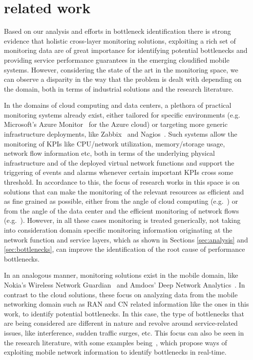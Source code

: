 \documentclass[journal,comsoc]{IEEEtran}
\begin{document}
\section{related work}
\label{sec:related}

% 
Based on our analysis and efforts in bottleneck identification there is strong evidence that holistic cross-layer monitoring solutions, exploiting a rich set of monitoring data are of great importance for identifying potential bottlenecks and providing service performance guarantees in the emerging cloudified mobile systems. However, considering the state of the art in the monitoring space, we can observe a disparity in the way that the problem is dealt with depending on the domain, both in terms of industrial solutions and the research literature.

% 
In the domains of cloud computing and data centers, a plethora of practical monitoring systems already exist, either tailored for specific environments (e.g. Microsoft's Azure Monitor~\cite{azure-mon} for the Azure cloud) or targeting more generic infrastructure deployments, like Zabbix~\cite{zabbix} and Nagios~\cite{nagios}. Such systems allow the monitoring of KPIs like CPU/network utilization, memory/storage usage, network flow information etc, both in terms of the underlying physical infrastructure and of the deployed virtual network functions and support the triggering of events and alarms whenever certain important KPIs cross some threshold. In accordance to this, the focus of research works in this space is on solutions that can make the monitoring of the relevant resources as efficient and as fine grained as possible, either from the angle of cloud computing (e.g.~\cite{calero2015monpaas}) or from the angle of the data center and the efficient monitoring of network flows (e.g.~\cite{li2016flowradar,moshref2016trumpet}). 
However, in all these cases monitoring is treated generically, not taking into consideration domain specific monitoring information originating at the network function and service layers, which as shown in Sections \ref{sec:analysis} and \ref{sec:bottlenecks}, can improve the identification of the root cause of performance bottlenecks. 

% 
In an analogous manner, monitoring solutions exist in the mobile domain, like Nokia's Wireless Network Guardian~\cite{nokia-wng} and Amdocs' Deep Network Analytics~\cite{amdocs}. 
In contrast to the cloud solutions, these focus on analyzing data from the mobile networking domain such as RAN  and CN related information like the ones in this work, to identify potential bottlenecks. In this case, the type of bottlenecks that are being considered are different in nature and revolve around service-related issues, like interference, sudden traffic surges, etc. This focus can also be seen in the research literature, with some examples being~\cite{iyer2015celliq,baranasuriya2015qprobe}, which propose ways of exploiting mobile network information to identify bottlenecks in real-time.
\end{document}
